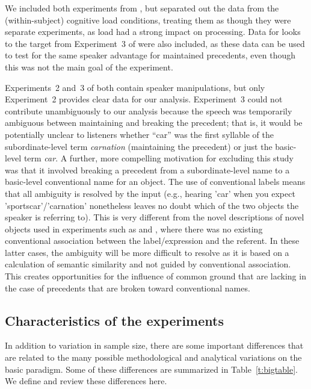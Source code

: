 \documentclass[doc,fignum,apacite,floatsintext]{apa6}
\begin{document}
We included both experiments from , but separated out the data from the (within-subject) cognitive load conditions, treating them as though they were separate experiments, as load had a strong impact on processing.  Data for looks to the target from Experiment~3 of  were also included, as these data can be used to test for the same speaker advantage for maintained precedents, even though this was not the main goal of the experiment.

Experiments~2 and~3 of  both contain speaker manipulations, but only Experiment~2 provides clear data for our analysis.  Experiment~3 could not contribute unambiguously to our analysis because the speech was temporarily ambiguous between maintaining and breaking the precedent; that is, it would be potentially unclear to listeners whether ``car'' was the first syllable of the subordinate-level term \textit{carnation} (maintaining the precedent) or just the basic-level term \textit{car}.  A further, more compelling motivation for excluding this study was that it involved breaking a precedent from a subordinate-level name to a basic-level conventional name for an object.  The use of conventional labels means that all ambiguity is resolved by the input (e.g., hearing 'car' when you expect 'sportscar'/'carnation' nonetheless leaves no doubt which of the two objects the speaker is referring to).  This is very different from the novel descriptions of novel objects used in experiments such as  and , where there was no existing conventional association between the label/expression and the referent.  In these latter cases, the ambiguity will be more difficult to resolve as it is based on a calculation of semantic similarity and not guided by conventional association.  This creates opportunities for the influence of common ground that are lacking in the case of precedents that are broken toward conventional names.

\subsection{Characteristics of the experiments}

In addition to variation in sample size, there are some important differences that are related to the many possible methodological and analytical variations on the basic paradigm.  Some of these differences are summarized in Table~\ref{t:bigtable}.  We define and review these differences here.
\end{document}
